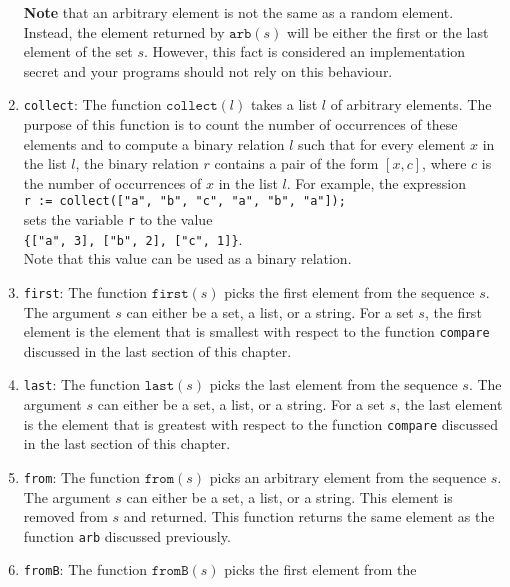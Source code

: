 \begin{enumerate}
      \textbf{Note} that an arbitrary element is not the same as a random element.  Instead, the
      element returned by $\texttt{arb}(s)$ will be either the first or the last element of the set
      $s$.  However, this fact is considered an implementation secret and your programs should not
      rely on this behaviour.
\item \texttt{collect}: The function $\texttt{collect}(l)$ takes a list $l$ of arbitrary elements.
      The purpose of this function is to count the number of occurrences of these elements and to
      compute a binary relation $l$ such that for every element $x$ in the list $l$, the binary
      relation $r$ contains a pair of the form $[x,c]$, where $c$ is the number of occurrences of
      $x$ in the list $l$. For example, the expression
      \\[0.2cm]
      \hspace*{1.3cm}
      \texttt{r := collect(["a", "b", "c", "a", "b", "a"]);}
      \\[0.2cm]
      sets the variable \texttt{r} to the value
      \\[0.2cm]
      \hspace*{1.3cm}
      \texttt{\{["a", 3], ["b", 2], ["c", 1]\}}.
      \\[0.2cm]
      Note that this value can be used as a binary relation.
\item \texttt{first}: The function $\texttt{first}(s)$ picks the first  element from the
      sequence $s$.  The argument $s$ can either be a set, a list, or a string.
      For a set $s$, the first element is the element that is smallest with respect to the
      function \texttt{compare} discussed in the last section of this chapter.
\item \texttt{last}: The function $\texttt{last}(s)$ picks the last element from the
      sequence $s$.  The argument $s$ can either be a set, a list, or a string.
      For a set $s$, the last element is the element that is greatest with respect to the
      function \texttt{compare} discussed in the last section of this chapter.
\item \texttt{from}: The function $\texttt{from}(s)$ picks an arbitrary element from the
      sequence $s$.  The argument $s$ can either be a set, a list, or a string.  This
      element is removed from $s$ and returned.  This function returns the same element as
      the function \texttt{arb} discussed previously.
\item \texttt{fromB}: The function $\texttt{fromB}(s)$ picks the first element from the

\end{enumerate}
